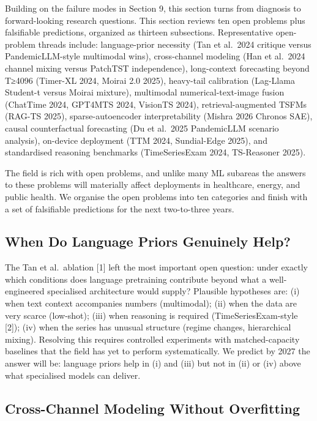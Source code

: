 Building on the failure modes in Section 9, this section turns from diagnosis to forward-looking research questions. This section reviews ten open problems plus falsifiable predictions, organized as thirteen subsections. Representative open-problem threads include: language-prior necessity (Tan et al.~2024 critique versus PandemicLLM-style multimodal wins), cross-channel modeling (Han et al.~2024 channel mixing versus PatchTST independence), long-context forecasting beyond T≥4096 (Timer-XL 2024, Moirai 2.0 2025), heavy-tail calibration (Lag-Llama Student-t versus Moirai mixture), multimodal numerical-text-image fusion (ChatTime 2024, GPT4MTS 2024, VisionTS 2024), retrieval-augmented TSFMs (RAG-TS 2025), sparse-autoencoder interpretability (Mishra 2026 Chronos SAE), causal counterfactual forecasting (Du et al.~2025 PandemicLLM scenario analysis), on-device deployment (TTM 2024, Sundial-Edge 2025), and standardised reasoning benchmarks (TimeSeriesExam 2024, TS-Reasoner 2025).

The field is rich with open problems, and unlike many ML subareas the answers to these problems will materially affect deployments in healthcare, energy, and public health. We organise the open problems into ten categories and finish with a set of falsifiable predictions for the next two-to-three years.

\subsection{When Do Language Priors Genuinely Help?}\label{when-do-language-priors-genuinely-help}

The Tan et al.~ablation {[}1{]} left the most important open question: under exactly which conditions does language pretraining contribute beyond what a well-engineered specialised architecture would supply? Plausible hypotheses are: (i) when text context accompanies numbers (multimodal); (ii) when the data are very scarce (low-shot); (iii) when reasoning is required (TimeSeriesExam-style {[}2{]}); (iv) when the series has unusual structure (regime changes, hierarchical mixing). Resolving this requires controlled experiments with matched-capacity baselines that the field has yet to perform systematically. We predict by 2027 the answer will be: language priors help in (i) and (iii) but not in (ii) or (iv) above what specialised models can deliver.

\subsection{Cross-Channel Modeling Without Overfitting}\label{cross-channel-modeling-without-overfitting}

